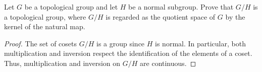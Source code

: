 \documentclass{article}
\begin{document}
 Let $G$ be a topological group and let $H$ be a normal subgroup. Prove that $G/H$ is a topological group,
where $G/H$ is regarded as the quotient space of $G$ by the kernel of the natural map.
\begin{proof}
The set of cosets $G/H$ is a group since $H$ is normal. In particular, both multiplication and inversion respect 
the identification of the elements of a coset.  Thus, multiplication and inversion on $G/H$ are continuous.
\end{proof}
\end{document}
